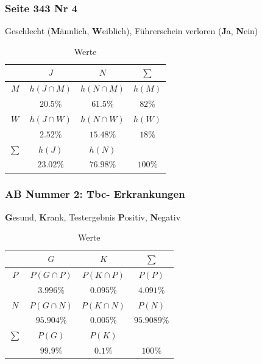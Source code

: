 \documentclass[a4paper,12pt]{article}
\begin{document}
\subsubsection*{Seite 343 Nr 4}
Geschlecht (\textbf{M}ännlich, \textbf{W}eiblich), Führerschein verloren (\textbf{J}a, \textbf{N}ein)
\begin{table}[h!]
  \begin{center}
    \caption{Werte}
    \label{tab:table1}
    \begin{tabular}{c|c|c|c} %
      \textbf{} & \textbf{$J$} & \textbf{$N$} & \textbf{$\sum$}\\
      \hline
      $M$ & $h(J \cap M)$ & $h(N \cap M)$ & $h(M)$\\
       & $20.5\%$ & $61.5 \%$ & $82 \%$\\
      \hline
      $W$ & $h(J \cap W)$ & $h(N \cap W)$ & $h(W)$\\
       & $2.52 \%$ & $15.48 \%$ & $18 \%$\\
      \hline
      $\sum$ & $h(J)$ & $h(N)$ & \\
       & $23.02 \%$ & $76.98 \%$ & $100 \%$\\
    \end{tabular}
  \end{center}
\end{table}
\subsubsection*{AB Nummer 2: Tbc- Erkrankungen}
\textbf{G}esund, \textbf{K}rank, Testergebnis \textbf{P}ositiv, \textbf{N}egativ
\begin{table}[h!]
  \begin{center}
    \caption{Werte}
    \label{tab:table1}
    \begin{tabular}{c|c|c|c} %
      \textbf{} & \textbf{$G$} & \textbf{$K$} & \textbf{$\sum$}\\
      \hline
      $P$ & $P(G \cap P)$ & $P(K \cap P)$ & $P(P)$\\
       & $3.996\%$ & $0.095 \%$ & $4.091 \%$\\
      \hline
      $N$ & $P(G \cap N)$ & $P(K \cap N)$ & $P(N)$\\
       & $95.904 \%$ & $0.005 \%$ & $95.908\overline{9} \%$\\
      \hline
      $\sum$ & $P(G)$ & $P(K)$ & \\
       & $99.9 \%$ & $0.1 \%$ & $100 \%$\\
    \end{tabular}
  \end{center}
\end{table}
\end{document}
